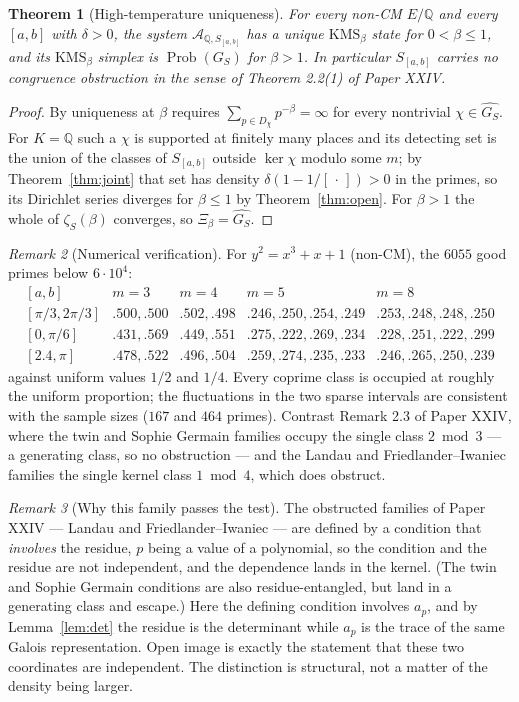 \documentclass[11pt]{amsart}
\numberwithin{equation}{section}
\newtheorem{theorem}{Theorem}[section]
\theoremstyle{definition}
\theoremstyle{remark}
\newtheorem{remark}[theorem]{Remark}
\newcommand{\Q}{\mathbb{Q}}
\newcommand{\cA}{\mathcal{A}}
\newcommand{\Prob}{\operatorname{Prob}}
\begin{document}
\begin{theorem}[High-temperature uniqueness]\label{thm:unique}
For every non-CM $E/\Q$ and every $[a,b]$ with $\delta>0$, the system
$\cA_{\Q,S_{[a,b]}}$ has a unique $\mathrm{KMS}_\beta$ state for $0<\beta\le1$, and its
$\mathrm{KMS}_\beta$ simplex is $\Prob(G_S)$ for $\beta>1$. In particular $S_{[a,b]}$ carries
\emph{no} congruence obstruction in the sense of Theorem 2.2(1) of Paper XXIV.
\end{theorem}

\begin{proof}
By \cite[Thm.~3.9]{Main} uniqueness at $\beta$ requires
$\sum_{p\in D_\chi}p^{-\beta}=\infty$ for every nontrivial $\chi\in\widehat{G_S}$. For
$K=\Q$ such a $\chi$ is supported at finitely many places and its detecting set is the union
of the classes of $S_{[a,b]}$ outside $\ker\chi$ modulo some $m$; by
Theorem~\ref{thm:joint} that set has density $\delta(1-1/[\,\cdot\,])>0$ in the primes, so
its Dirichlet series diverges for $\beta\le1$ by Theorem~\ref{thm:open}. For $\beta>1$ the
whole of $\zeta_S(\beta)$ converges, so $\Xi_\beta=\widehat{G_S}$.
\end{proof}

\begin{remark}[Numerical verification]\label{rem:numjoint}
For $y^2=x^3+x+1$ (non-CM), the $6055$ good primes below $6\cdot10^4$:
\[
\begin{array}{lcccc}
[a,b] & m=3 & m=4 & m=5 & m=8\\\hline
[\pi/3,2\pi/3] & .500,.500 & .502,.498 & .246,.250,.254,.249 & .253,.248,.248,.250\\
{[0,\pi/6]} & .431,.569 & .449,.551 & .275,.222,.269,.234 & .228,.251,.222,.299\\
{[2.4,\pi]} & .478,.522 & .496,.504 & .259,.274,.235,.233 & .246,.265,.250,.239
\end{array}
\]
against uniform values $1/2$ and $1/4$. Every coprime class is occupied at roughly the
uniform proportion; the fluctuations in the two sparse intervals are consistent with the
sample sizes ($167$ and $464$ primes). Contrast Remark 2.3 of Paper XXIV, where the twin
and Sophie Germain families occupy the single class $2\bmod3$ --- a generating class, so no
obstruction --- and the Landau and
Friedlander--Iwaniec families the single kernel class $1\bmod4$, which does obstruct.
\end{remark}

\begin{remark}[Why this family passes the test]\label{rem:whypass}
The obstructed families of Paper XXIV --- Landau and Friedlander--Iwaniec --- are defined by
a condition that \emph{involves}
the residue, $p$ being a value of a polynomial, so the condition and
the residue are not independent, and the dependence lands in the kernel. (The twin and
Sophie Germain conditions are also residue-entangled, but land in a generating class and
escape.) Here the defining condition involves $a_p$, and by
Lemma~\ref{lem:det} the residue is the determinant while $a_p$ is the trace of the same
Galois representation. Open image is exactly the statement that these two coordinates are
independent. The distinction is structural, not a matter of the density being larger.
\end{remark}
\end{document}
